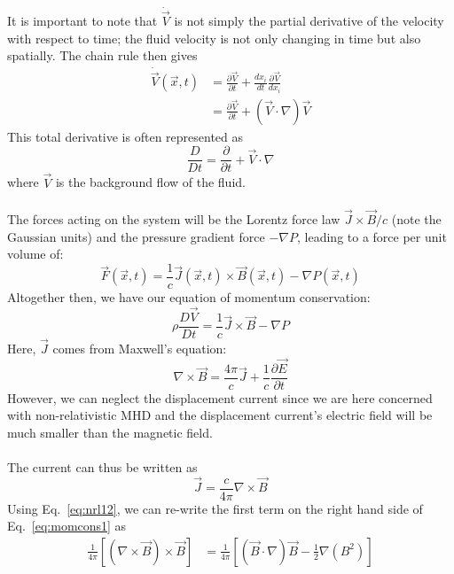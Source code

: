   \\
  It is important to note that $\dot{\vec V}$ is not simply the partial derivative of the velocity with respect to time; the fluid velocity is not only changing in time but also spatially. The chain rule then gives
  \begin{align}
    \dot{ \vec V}(\vec x,t)&=\frac{\partial \vec V}{\partial t}+\frac{dx_i}{dt}\frac{\partial \vec V}{dx_i}\\
    &=\frac{\partial\vec V}{\partial t}+\left(\vec V\cdot\nabla\right)\vec V
  \end{align}
  This total derivative is often represented as
  \begin{equation}
    \frac{D}{Dt}=\frac\partial{\partial t}+\vec V\cdot\nabla
  \end{equation}
  where $\vec V$ is the background flow of the fluid.\\
\\
  The forces acting on the system will be the Lorentz force law $\vec J\times\vec B/c$ (note the Gaussian units) and the pressure gradient force $-\nabla P$, leading to a force per unit volume of:
\begin{equation}
  \vec F(\vec x,t)=\frac1c\vec J(\vec x,t)\times \vec B(\vec x,t)-\nabla P(\vec x,t)
\end{equation}
Altogether then, we have our equation of momentum conservation:
\begin{equation}
  \rho\frac{D\vec V}{Dt}=\frac1c\vec J\times\vec B-\nabla P \label{eq:momcons1}
\end{equation}
Here, $\vec J$ comes from Maxwell's equation:
\begin{equation}
  \nabla\times\vec B=\frac{4\pi}c\vec J+\frac1c\frac{\partial\vec E}{\partial t}
\end{equation}
However, we can neglect the displacement current since we are here concerned with non-relativistic MHD and the displacement current's electric field will be much smaller than the magnetic field.\\
\\
The current can thus be written as
\begin{equation}
  \vec J=\frac{c}{4\pi}\nabla\times\vec B \label{eq:current}
\end{equation}
Using Eq.~\ref{eq:nrl12}, we can re-write the first term on the right hand side of Eq.~\ref{eq:momcons1} as
\begin{align}
  \frac1{4\pi}\left[(\nabla\times\vec B)\times\vec B\right]&=\frac1{4\pi}\left[(\vec B\cdot\nabla)\vec B-\frac12\nabla(B^2)\right]\\
\end{align}
